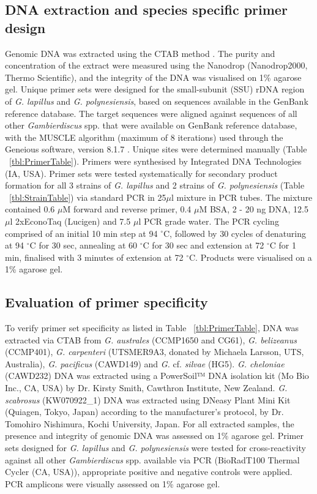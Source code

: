 \documentclass[12pt]{article}
\begin{document}
\subsection*{DNA extraction and species specific primer design}
Genomic DNA was extracted using the CTAB method \citep{zhou1999analysis}. The purity and concentration of the extract were measured using the Nanodrop (Nanodrop2000, Thermo Scientific), and the integrity of the DNA was visualised on 1\% agarose gel.
Unique primer sets were designed for the small-subunit (SSU) rDNA region of \emph{G. lapillus} and \emph{G. polynesiensis}, based on sequences available in the GenBank reference database. The target sequences were aligned against sequences of all other \emph{Gambierdiscus} spp. that were available on GenBank reference database, with the MUSCLE algorithm (maximum of 8 iterations) \citep{edgar2004muscle} used through the Geneious software, version 8.1.7 \citep{kearse2012geneious}. Unique sites were determined manually (Table ~\ref{tbl:PrimerTable}). Primers were synthesised by Integrated DNA Technologies (IA, USA).
Primer sets were tested systematically for secondary product formation for all 3 strains of \emph{G. lapillus} and 2 strains of \emph{G. polynesiensis} (Table ~\ref{tbl:StrainTable}) via standard PCR in 25$\mu$l mixture in PCR tubes. The mixture contained 0.6 $\mu$M forward and reverse primer, 0.4 $\mu$M BSA, 2 - 20 ng DNA, 12.5 $\mu$l 2xEconoTaq (Lucigen) and 7.5 $\mu$l PCR grade water.
The PCR cycling comprised of an initial 10 min step at 94 $^{\circ}$C, followed by 30 cycles of denaturing at 94 $^{\circ}$C for 30 sec, annealing at 60 $^{\circ}$C for 30 sec and extension at 72 $^{\circ}$C for 1 min, finalised with 3 minutes of extension at 72 $^{\circ}$C. Products were visualised on a 1\% agarose gel.


\subsection*{Evaluation of primer specificity}
To verify primer set specificity as listed in Table ~\ref{tbl:PrimerTable}, DNA was extracted via CTAB from \emph{G. australes} (CCMP1650 and CG61), \emph{G. belizeanus} (CCMP401), \emph{G. carpenteri} (UTSMER9A3, donated by Michaela Larsson, UTS, Australia), \emph{G. pacificus} (CAWD149) and \emph{G.} cf. \emph{silvae} (HG5). \emph{G. cheloniae} (CAWD232) DNA was extracted using a PowerSoil™ DNA isolation kit (Mo Bio Inc., CA, USA) by Dr. Kirsty Smith, Cawthron Institute, New Zealand. \emph{G. scabrosus} (KW070922\_1) DNA was extracted using DNeasy Plant Mini Kit (Quiagen, Tokyo, Japan) according to the manufacturer's protocol, by Dr. Tomohiro Nishimura, Kochi University, Japan. For all extracted samples, the presence and integrity of genomic DNA was assessed on 1\% agarose gel. Primer sets designed for \emph{G. lapillus} and \emph{G. polynesiensis} were tested for cross-reactivity against all other \emph{Gambierdiscus} spp. available via PCR (BioRadT100 Thermal Cycler (CA, USA)), appropriate positive and negative controls were applied. PCR amplicons were visually assessed on 1\% agarose gel.
\end{document}

